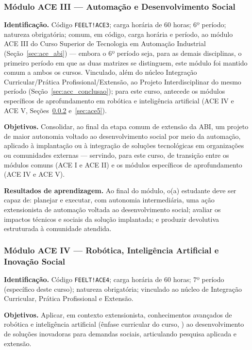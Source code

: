 \subsubsection{Módulo ACE III --- Automação e Desenvolvimento Social}
\label{sec:ace3}

\textbf{Identificação.} Código \texttt{FEELT!ACE3}; carga horária de 60 horas; 6º período; natureza obrigatória; comum, em código, carga horária e período, ao módulo ACE III do Curso Superior de Tecnologia em Automação Industrial (Seção~\ref{sec:ace_abi}) — embora o 6º período seja, para as demais disciplinas, o primeiro período em que as duas matrizes se distinguem, este módulo foi mantido comum a ambos os cursos. Vinculado, além do núcleo Integração Curricular/Prática Profissional/Extensão, ao Projeto Interdisciplinar do mesmo período (Seção~\ref{sec:acc_conclusao}); para este curso, antecede os módulos específicos de aprofundamento em robótica e inteligência artificial (ACE IV e ACE V, Seções~\ref{sec:ace4} e~\ref{sec:ace5}).

\textbf{Objetivos.} Consolidar, ao final da etapa comum de extensão da ABI, um projeto de maior autonomia voltado ao desenvolvimento social por meio da automação, aplicado à implantação ou à integração de soluções tecnológicas em organizações ou comunidades externas — servindo, para este curso, de transição entre os módulos comuns (ACE I e ACE II) e os módulos específicos de aprofundamento (ACE IV e ACE V).

\textbf{Resultados de aprendizagem.} Ao final do módulo, o(a) estudante deve ser capaz de: planejar e executar, com autonomia intermediária, uma ação extensionista de automação voltada ao desenvolvimento social; avaliar os impactos técnicos e sociais da solução implantada; e produzir devolutiva estruturada à comunidade atendida.

\subsubsection{Módulo ACE IV --- Robótica, Inteligência Artificial e Inovação Social}
\label{sec:ace4}

\textbf{Identificação.} Código \texttt{FEELT!ACE4}; carga horária de 60 horas; 7º período (específico deste curso); natureza obrigatória; vinculado ao núcleo de Integração Curricular, Prática Profissional e Extensão.

\textbf{Objetivos.} Aplicar, em contexto extensionista, conhecimentos avançados de robótica e inteligência artificial (ênfase curricular do curso, \ppcenfasecurricular) ao desenvolvimento de soluções inovadoras para demandas sociais, articulando pesquisa aplicada e extensão.

